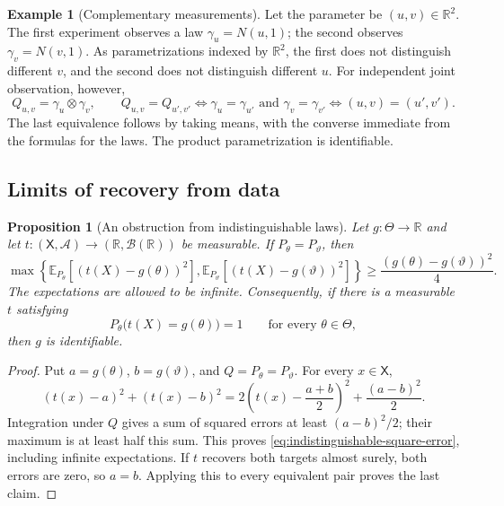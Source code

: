\documentclass[11pt,oneside]{book}
\newtheorem{proposition}[theorem]{Proposition}
\theoremstyle{definition}
\newtheorem{example}[theorem]{Example}
\theoremstyle{remark}
\newcommand{\R}{\mathbb R}
\begin{document}
\begin{example}[Complementary measurements]
\label{ex:complementary-identification}
Let the parameter be $(u,v)\in\R^2$. The first experiment observes a law
$\gamma_u=N(u,1)$; the second observes $\gamma_v=N(v,1)$.
As parametrizations indexed by $\R^2$, the first does not distinguish
different $v$, and the second does not distinguish different $u$.
For independent joint observation, however,
\[
Q_{u,v}=\gamma_u\otimes\gamma_v,\qquad
Q_{u,v}=Q_{u',v'}
\iff \gamma_u=\gamma_{u'}\text{ and }\gamma_v=\gamma_{v'}
\iff (u,v)=(u',v').
\]
The last equivalence follows by taking means, with the converse immediate
from the formulas for the laws. The product parametrization is identifiable.
\end{example}

\subsection{Limits of recovery from data}
\label{subsec:identifiability-recovery}

\begin{proposition}[An obstruction from indistinguishable laws]
\label{prop:indistinguishable-error}
Let $g:\Theta\to\R$ and let
$t:(\mathsf X,\mathcal A)\to(\R,\mathcal B(\R))$ be measurable.
If $P_\theta=P_\vartheta$, then
\begin{equation}
\max\left\{
\mathbb E_{P_\theta}\!\left[(t(X)-g(\theta))^2\right],
\mathbb E_{P_\vartheta}\!\left[(t(X)-g(\vartheta))^2\right]
\right\}
\geq \frac{(g(\theta)-g(\vartheta))^2}{4}.
\label{eq:indistinguishable-square-error}
\end{equation}
The expectations are allowed to be infinite.
Consequently, if there is a measurable $t$ satisfying
\[
P_\theta\bigl(t(X)=g(\theta)\bigr)=1\qquad\text{for every }\theta\in\Theta,
\]
then $g$ is identifiable.
\end{proposition}
\begin{proof}
Put $a=g(\theta)$, $b=g(\vartheta)$, and $Q=P_\theta=P_\vartheta$.
For every $x\in\mathsf X$,
\[
(t(x)-a)^2+(t(x)-b)^2
=2\left(t(x)-\frac{a+b}{2}\right)^2+\frac{(a-b)^2}{2}.
\]
Integration under $Q$ gives a sum of squared errors at least $(a-b)^2/2$;
their maximum is at least half this sum.
This proves \eqref{eq:indistinguishable-square-error}, including infinite
expectations. If $t$ recovers both targets almost surely, both errors are
zero, so $a=b$. Applying this to every equivalent pair proves the last claim.
\end{proof}
\end{document}
